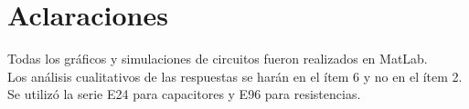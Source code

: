 \section*{Aclaraciones}
Todas los gráficos y simulaciones de circuitos fueron realizados en MatLab.\\
\vskip0.5cm
Los análisis cualitativos de las respuestas se harán en el ítem 6 y no en el ítem 2.\\
\vskip0.5cm
Se utilizó la serie E24 para capacitores y E96 para resistencias.